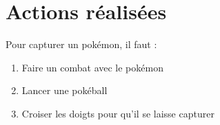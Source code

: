\documentclass[../main.tex]{subfiles}
\begin{document}
\section{Actions réalisées}
     
  Pour capturer un pokémon, il faut :
  \begin{enumerate}
    \item Faire un combat avec le pokémon
    \item Lancer une pokéball
    \item Croiser les doigts pour qu'il se laisse capturer
  \end{enumerate}
\end{document}
